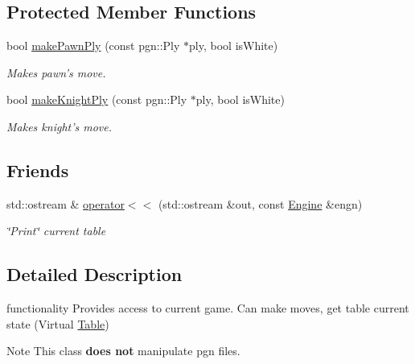 \subsection*{Protected Member Functions}
\begin{DoxyCompactItemize}
\item 
bool \hyperlink{classChEngn_1_1Engine_a5ee94d0b489d05ef5e643cb9cfe5ac1a}{makePawnPly} (const pgn::Ply $\ast$ply, bool isWhite)
\begin{DoxyCompactList}\small\item\em Makes pawn's move. \item\end{DoxyCompactList}\item 
bool \hyperlink{classChEngn_1_1Engine_a1dc6130dd986b0b0b8960a3c1e99f87c}{makeKnightPly} (const pgn::Ply $\ast$ply, bool isWhite)
\begin{DoxyCompactList}\small\item\em Makes knight's move. \item\end{DoxyCompactList}\end{DoxyCompactItemize}
\subsection*{Friends}
\begin{DoxyCompactItemize}
\item 
\hypertarget{classChEngn_1_1Engine_a886da6512b271d26a1fee49a317d2308}{
std::ostream \& \hyperlink{classChEngn_1_1Engine_a886da6512b271d26a1fee49a317d2308}{operator$<$$<$} (std::ostream \&out, const \hyperlink{classChEngn_1_1Engine}{Engine} \&engn)}
\label{classChEngn_1_1Engine_a886da6512b271d26a1fee49a317d2308}

\begin{DoxyCompactList}\small\item\em \char`\"{}Print\char`\"{} current table \item\end{DoxyCompactList}\end{DoxyCompactItemize}


\subsection{Detailed Description}
functionality Provides access to current game. Can make moves, get table current state (Virtual \hyperlink{classChEngn_1_1Table}{Table}) \begin{DoxyNote}{Note}
This class {\bfseries does not} manipulate pgn files. 
\end{DoxyNote}


